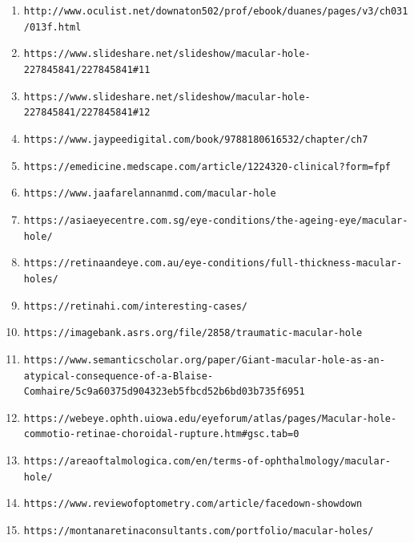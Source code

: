 \documentclass{article}
\begin{document}
\begin{enumerate}
			\item \nolinkurl{http://www.oculist.net/downaton502/prof/ebook/duanes/pages/v3/ch031/013f.html}
			
			\item \nolinkurl{https://www.slideshare.net/slideshow/macular-hole-227845841/227845841#11}
			
			\item \nolinkurl{https://www.slideshare.net/slideshow/macular-hole-227845841/227845841#12}
			
			\item \nolinkurl{https://www.jaypeedigital.com/book/9788180616532/chapter/ch7}
			
			\item \nolinkurl{https://emedicine.medscape.com/article/1224320-clinical?form=fpf}
			
			\item \nolinkurl{https://www.jaafarelannanmd.com/macular-hole}
			
			\item \nolinkurl{https://asiaeyecentre.com.sg/eye-conditions/the-ageing-eye/macular-hole/}
			
			\item \nolinkurl{https://retinaandeye.com.au/eye-conditions/full-thickness-macular-holes/}
			
			\item \nolinkurl{https://retinahi.com/interesting-cases/}
			
			\item \nolinkurl{https://imagebank.asrs.org/file/2858/traumatic-macular-hole}
			
			\item \nolinkurl{https://www.semanticscholar.org/paper/Giant-macular-hole-as-an-atypical-consequence-of-a-Blaise-Comhaire/5c9a60375d904323eb5fbcd52b6bd03b735f6951}
			
			\item \nolinkurl{https://webeye.ophth.uiowa.edu/eyeforum/atlas/pages/Macular-hole-commotio-retinae-choroidal-rupture.htm#gsc.tab=0}
			
			
			\item \nolinkurl{https://areaoftalmologica.com/en/terms-of-ophthalmology/macular-hole/}
			
			\item \nolinkurl{https://www.reviewofoptometry.com/article/facedown-showdown}
			
			\item \nolinkurl{https://montanaretinaconsultants.com/portfolio/macular-holes/}
			

\end{enumerate}
\end{document}
